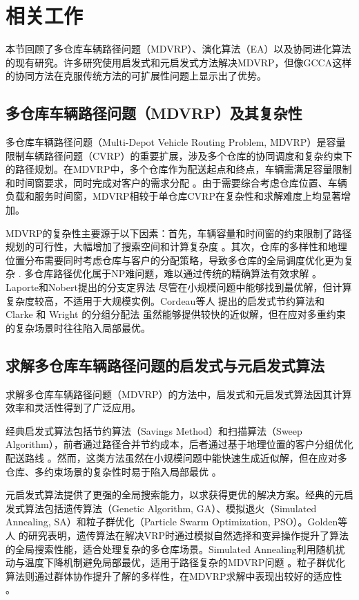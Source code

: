\documentclass[12pt,a4paper,oneside]{ctexart}
\begin{document}
	
\section{相关工作}
本节回顾了多仓库车辆路径问题（MDVRP）、演化算法（EA）以及协同进化算法的现有研究。许多研究使用启发式和元启发式方法解决MDVRP，但像GCCA这样的协同方法在克服传统方法的可扩展性问题上显示出了优势。
	
\subsection{多仓库车辆路径问题（MDVRP）及其复杂性}

多仓库车辆路径问题（Multi-Depot Vehicle Routing Problem, MDVRP）是容量限制车辆路径问题（CVRP）的重要扩展，涉及多个仓库的协同调度和复杂约束下的路径规划。在MDVRP中，多个仓库作为配送起点和终点，车辆需满足容量限制和时间窗要求，同时完成对客户的需求分配 \cite{laporte1987exact, cordeau1997savings}。由于需要综合考虑仓库位置、车辆负载和服务时间窗，MDVRP相较于单仓库CVRP在复杂性和求解难度上均显著增加。

MDVRP的复杂性主要源于以下因素：首先，车辆容量和时间窗的约束限制了路径规划的可行性，大幅增加了搜索空间和计算复杂度 \cite{golden1998impact}。其次，仓库的多样性和地理位置分布需要同时考虑仓库与客户的分配策略，导致多仓库的全局调度优化更为复杂 \cite{salhi1991multi}. 多仓库路径优化属于NP难问题，难以通过传统的精确算法有效求解 \cite{clarke1964savings}。Laporte和Nobert提出的分支定界法 \cite{laporte1987exact} 尽管在小规模问题中能够找到最优解，但计算复杂度较高，不适用于大规模实例。Cordeau等人 \cite{cordeau1997savings} 提出的启发式节约算法和 Clarke 和 Wright 的分组分配法 \cite{clarke1964savings} 虽然能够提供较快的近似解，但在应对多重约束的复杂场景时往往陷入局部最优。



\subsection{求解多仓库车辆路径问题的启发式与元启发式算法}

求解多仓库车辆路径问题（MDVRP）的方法中，启发式和元启发式算法因其计算效率和灵活性得到了广泛应用。

经典启发式算法包括节约算法（Savings Method）和扫描算法（Sweep Algorithm），前者通过路径合并节约成本，后者通过基于地理位置的客户分组优化配送路线 \cite{clarke1964savings}。然而，这类方法虽然在小规模问题中能快速生成近似解，但在应对多仓库、多约束场景的复杂性时易于陷入局部最优 \cite{salhi1991multi}。

元启发式算法提供了更强的全局搜索能力，以求获得更优的解决方案。经典的元启发式算法包括遗传算法（Genetic Algorithm, GA）、模拟退火（Simulated Annealing, SA）和粒子群优化（Particle Swarm Optimization, PSO）。Golden等人 \cite{golden1998impact} 的研究表明，遗传算法在解决VRP时通过模拟自然选择和变异操作提升了算法的全局搜索性能，适合处理复杂的多仓库场景。Simulated Annealing利用随机扰动与温度下降机制避免局部最优，适用于路径复杂的MDVRP问题 \cite{cordeau1997savings}。粒子群优化算法则通过群体协作提升了解的多样性，在MDVRP求解中表现出较好的适应性 \cite{ai2009particle}。
\end{document}

